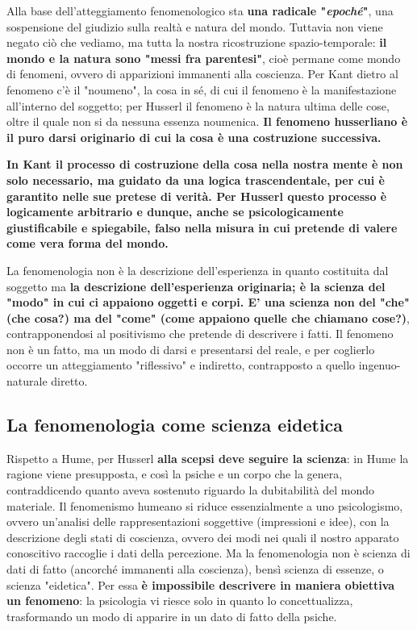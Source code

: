 Alla base dell'atteggiamento fenomenologico
sta \textbf{una radicale "\textit{epoché}"}, una sospensione del
giudizio sulla realtà e natura del mondo.
Tuttavia non viene negato ciò che vediamo, ma
tutta la nostra ricostruzione spazio-temporale:
\textbf{il mondo e la natura sono "messi fra parentesi"},
cioè permane come mondo di fenomeni, ovvero
di apparizioni immanenti alla coscienza.
Per Kant dietro al fenomeno c'è il "noumeno", la cosa
in sé, di cui il fenomeno è la manifestazione
all'interno del soggetto; per Husserl il fenomeno è la natura ultima delle cose, oltre il
quale non si da nessuna essenza noumenica.
\textbf{Il fenomeno husserliano è il puro darsi originario
di cui la cosa è una costruzione successiva.}

\textbf{In Kant il processo di costruzione della cosa
nella nostra mente è non solo necessario, ma
guidato da una logica trascendentale, per cui
è garantito nelle sue pretese di verità. Per
Husserl questo processo è logicamente
arbitrario e dunque, anche se psicologicamente
giustificabile e spiegabile, falso nella misura
in cui pretende di valere come vera forma
del mondo.}

La fenomenologia non è la descrizione dell'esperienza in quanto costituita dal soggetto
ma \textbf{la descrizione dell'esperienza originaria;
è la scienza del "modo" in cui ci appaiono
oggetti e corpi. E' una scienza non del "che"
(che cosa?) ma del "come" (come appaiono
quelle che chiamano cose?)}, contrapponendosi al
positivismo che pretende di descrivere i fatti.
Il fenomeno non è un fatto, ma un
modo di darsi e presentarsi del reale, e
per coglierlo occorre un atteggiamento
"riflessivo" e indiretto, contrapposto a
quello ingenuo-naturale diretto.

\subsection{La fenomenologia come scienza eidetica}

Rispetto a Hume, per Husserl \textbf{alla scepsi deve
seguire la scienza}: in Hume la ragione viene
presupposta, e così la psiche e un corpo che la
genera, contraddicendo quanto aveva sostenuto
riguardo la dubitabilità del mondo materiale.
Il fenomenismo humeano si riduce essenzialmente
a uno psicologismo, ovvero un'analisi delle
rappresentazioni soggettive (impressioni e idee),
con la descrizione degli stati di coscienza,
ovvero dei modi nei quali il nostro apparato
conoscitivo raccoglie i dati della percezione.
Ma la fenomenologia non è scienza di dati
di fatto (ancorché immanenti alla coscienza),
bensì scienza di essenze, o scienza "eidetica".
Per essa \textbf{è impossibile descrivere in maniera obiettiva
un fenomeno}: la psicologia vi riesce solo in quanto
lo concettualizza, trasformando un modo di
apparire in un dato di fatto della psiche.

